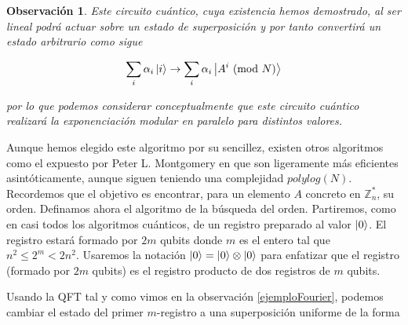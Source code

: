 \documentclass[11pt, spanish]{report}
\numberwithin{equation}{section}
\newtheorem{obs}[defin]{Observación}
\numberwithin{defin}{section}
\begin{document}
\begin{obs}
Este circuito cuántico, cuya existencia hemos demostrado, al ser lineal podrá actuar sobre un estado de superposición y por tanto convertirá un estado arbitrario como sigue

\begin{equation}
\sum_i \alpha_i\ket{i}\rightarrow\sum_i \alpha_i \ket{A^i\ (\text{mod }N)}
\end{equation}

\noindent por lo que podemos considerar conceptualmente que este circuito cuántico realizará la exponenciación modular en paralelo para distintos valores.
\end{obs}

Aunque hemos elegido este algoritmo por su sencillez, existen otros algoritmos como el expuesto por Peter L. Montgomery en \cite	{Montgomery} que son ligeramente más eficientes asintóticamente, aunque siguen teniendo una complejidad $polylog(N)$.\\

Recordemos que el objetivo es encontrar, para un elemento $A$ concreto en $\mathbb{Z}_n^*$, su orden. Definamos ahora el algoritmo de la búsqueda del orden. Partiremos, como en casi todos los algoritmos cuánticos, de un registro preparado al valor $\ket{0}$. El registro estará formado por $2m$ qubits donde $m$ es el entero tal que\footnotemark{} $n^2\leq 2^m < 2n^2$. Usaremos la notación $\ket{0}=\ket{0}\otimes\ket{0}$ para enfatizar que el registro (formado por $2m$ qubits) es el registro producto de dos registros de $m$ qubits.\\


Usando la QFT tal y como vimos en la observación \ref{ejemploFourier}, podemos cambiar el estado del primer $m$-registro a una superposición uniforme de la forma
\end{document}
